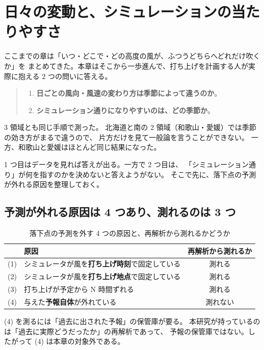 \section{日々の変動と、シミュレーションの当たりやすさ}
\label{sec:fidelity}

ここまでの章は「いつ・どこで・どの高度の風が、ふつうどちらへどれだけ吹くか」を
まとめてきた。本章はそこから一歩進んで、打ち上げを計画する人が実際に抱える
2 つの問いに答える。

\begin{quote}
\begin{enumerate}
\item \textbf{日ごとの風向・風速の変わり方は季節によって違うのか}。
\item \textbf{シミュレーション通りになりやすいのは、どの季節か}。
\end{enumerate}
\end{quote}

3 領域とも同じ手順で測った。
北海道と南の 2 領域（和歌山・愛媛）では季節の効き方がまるで違うので、
片方だけを見て一般論を言うことができない。
一方、和歌山と愛媛はほとんど同じ結果になった。

1 つ目はデータを見れば答えが出る。一方で 2 つ目は、
「シミュレーション通り」が何を指すのかを決めないと答えようがない。
そこで先に、落下点の予測が外れる原因を整理しておく。

\subsection{予測が外れる原因は 4 つあり、測れるのは 3 つ}
\label{sec:fidelity-scope}

\begin{table}[H]
\centering
\caption{落下点の予測を外す 4 つの原因と、再解析から測れるかどうか}
\label{tab:fidelity-sources}
\begin{tabular}{@{}llc@{}}
\toprule
 & 原因 & 再解析から測れるか \\
\midrule
(1) & シミュレータが風を\textbf{打ち上げ時刻}で固定している & 測れる \\
(2) & シミュレータが風を\textbf{打ち上げ地点}で固定している & 測れる \\
(3) & 打ち上げが予定から N 時間ずれる & 測れる \\
(4) & 与えた\textbf{予報自体}が外れている & 測れない \\
\bottomrule
\end{tabular}
\end{table}

(4) を測るには「過去に出された予報」の保管庫が要る。
本研究が持っているのは「過去に実際どうだったか」の再解析であって、
予報の保管庫ではない。したがって (4) は本章の対象外である。

